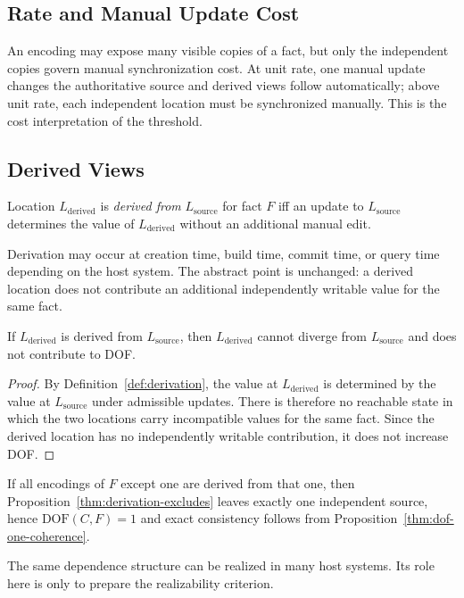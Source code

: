 \subsection{Rate and Manual Update Cost}\label{sec:ssot-vs-m}

An encoding may expose many visible copies of a fact, but only the independent copies govern manual synchronization cost. At unit rate, one manual update changes the authoritative source and derived views follow automatically; above unit rate, each independent location must be synchronized manually. This is the cost interpretation of the threshold.

\subsection{Derived Views}\label{sec:derivation}

\begin{definition}[Derivation]\label{def:derivation}
Location $L_{\text{derived}}$ is \emph{derived from} $L_{\text{source}}$ for fact $F$ iff an update to $L_{\text{source}}$ determines the value of $L_{\text{derived}}$ without an additional manual edit.
\end{definition}

Derivation may occur at creation time, build time, commit time, or query time depending on the host system. The abstract point is unchanged: a derived location does not contribute an additional independently writable value for the same fact.

\begin{proposition}\label{thm:derivation-excludes}
If $L_{\text{derived}}$ is derived from $L_{\text{source}}$, then $L_{\text{derived}}$ cannot diverge from $L_{\text{source}}$ and does not contribute to DOF.
\end{proposition}

\begin{proof}
By Definition~\ref{def:derivation}, the value at $L_{\text{derived}}$ is determined by the value at $L_{\text{source}}$ under admissible updates. There is therefore no reachable state in which the two locations carry incompatible values for the same fact. Since the derived location has no independently writable contribution, it does not increase DOF.
\end{proof}

If all encodings of $F$ except one are derived from that one, then Proposition~\ref{thm:derivation-excludes} leaves exactly one independent source, hence $\text{DOF}(C,F)=1$ and exact consistency follows from Proposition~\ref{thm:dof-one-coherence}.

The same dependence structure can be realized in many host systems. Its role here is only to prepare the realizability criterion.

